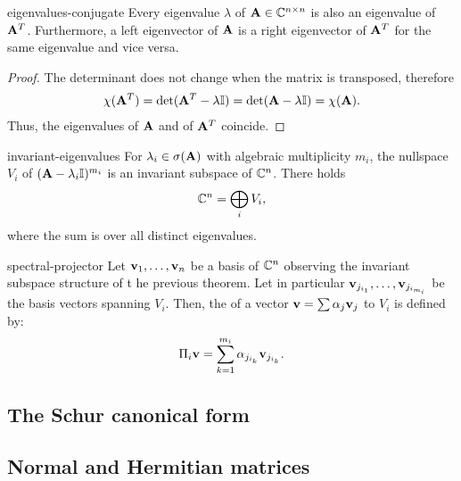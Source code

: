 \begin{Lemma}{eigenvalues-conjugate}
  Every eigenvalue $\lambda$ of $\mathbf A\in\mathbb C^{n\times n}$ is also an
  eigenvalue of $\mathbf A^T$. Furthermore, a left eigenvector of $\mathbf A$
  is a right eigenvector of $\mathbf A^T$ for the same eigenvalue and vice
  versa.
\end{Lemma}

\begin{proof}
  The determinant does not change when the matrix is transposed, therefore
  \begin{gather}
    \chi(\mathbf A^T)
    = \det(\mathbf A^T-\lambda \mathbb I)
    = \det(\mathbf A-\lambda \mathbb I)
    = \chi(\mathbf A).
  \end{gather}
  Thus, the eigenvalues of $\mathbf A$ and of $\mathbf A^T$ coincide.
\end{proof}

\begin{Theorem}{invariant-eigenvalues}
  For $\lambda_i\in \sigma(\mathbf A)$ with algebraic multiplicity $m_i$, the
  nullspace $V_i$ of $(\mathbf A-\lambda_i\mathbb I)^{m_i}$ is an invariant subspace
  of $\mathbb C^n$. There holds
  \begin{gather}
    \mathbb C^n = \bigoplus_{i} V_i,
  \end{gather}
  where the sum is over all distinct eigenvalues.
\end{Theorem}

\begin{Definition}{spectral-projector}
  Let $\mathbf v_1,\dots,\mathbf v_n$ be a basis of $\mathbb C^n$ observing the invariant
  subspace structure of t he previous theorem. Let in particular
  $\mathbf v_{j_{i_1}},\dots,\mathbf v_{j_{i_{m_i}}}$ be the basis vectors spanning
  $V_i$. Then, the  of a vector $\mathbf v = \sum \alpha_j \mathbf v_j$ to
  $V_i$ is defined by:
  \begin{gather}
    \Pi_i \mathbf v = \sum_{k=1}^{m_i} \alpha_{j_{i_k}} \mathbf v_{j_{i_k}}.
  \end{gather}
\end{Definition}

\subsection{The Schur canonical form}


\subsection{Normal and Hermitian matrices}

